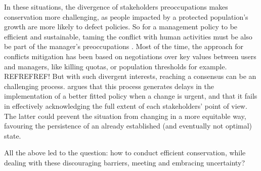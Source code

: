 \documentclass[12pt,a4paper]{article}
\begin{document}
In these situations, the divergence of stakeholders preoccupations makes conservation more challenging, as people impacted by a protected population's growth are more likely to defect policies.
So for a management policy to be efficient and sustainable, taming the conflict with human activities must be also be part of the manager's preoccupations \citep{redpath2013understanding}.
Most of the time, the approach for conflicts mitigation has been based on negotiations over key values between users and managers, like killing quotas, or population thresholds for example. REFREFREF!
But with such divergent interests, reaching a consensus can be an challenging process.
\cite{peterson2005conservation} argues that this process generates delays in the implementation of a better fitted policy when a change is urgent, and that it %
fails in effectively acknowledging the full extent of each stakeholders' point of view.
The latter could prevent the situation from changing in a more equitable way, favouring the persistence of an already established (and eventually not optimal) state.

All the above led to the question: how to conduct efficient conservation, while dealing with these discouraging barriers, meeting and embracing uncertainty?

%
\end{document}

